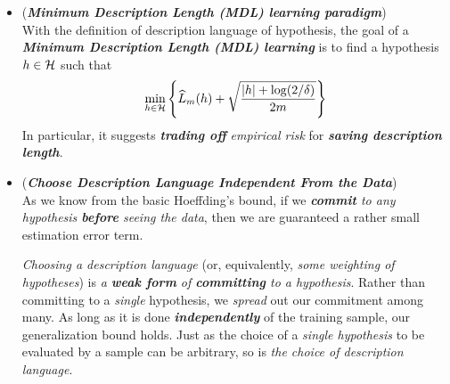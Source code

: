 \documentclass[11pt]{article}
\begin{document}
\begin{itemize}
\item \begin{definition} (\emph{\textbf{Minimum Description Length (MDL) learning paradigm}})\\
With the definition of description language of hypothesis, the goal of a \emph{\textbf{Minimum Description Length (MDL) learning}} is to find a hypothesis $h \in {\mathcal H}$ such that 
\begin{align}
\min_{h \in {\mathcal H}}\left\{\widehat{L}_{m}(h) + \sqrt{\frac{\left\lvert h \right\rvert + \log(2/\delta)}{2m}}\right\}   \label{eqn: srm_mdl}
\end{align} In particular, it suggests \emph{\textbf{trading off}} \emph{empirical risk} for \emph{\textbf{saving description length}}. 
\end{definition}

\item \begin{remark} (\textbf{\emph{Choose Description Language Independent From the Data}})\\
As we know from the basic Hoeffding's bound, if we \emph{\textbf{commit} to any hypothesis \textbf{before} seeing the data}, then we are guaranteed a rather small estimation error term. 

\emph{Choosing a description language} (or, equivalently, \emph{some weighting of hypotheses}) is \emph{a \textbf{weak form} of \textbf{committing} to a hypothesis}. Rather than committing to a \emph{single} hypothesis, we \emph{spread} out our commitment among many. As long as it is done \emph{\textbf{independently}} of the training sample, our generalization bound holds. Just as the choice of a \emph{single hypothesis} to be evaluated by a sample can be arbitrary, so is \emph{the choice of description language}.
\end{remark}
\end{itemize}

\newpage


\end{document}
